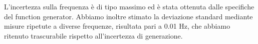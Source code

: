 \documentclass[../Relazione_circuiti]{subfile}
\begin{document}
L'incertezza sulla frequenza è di tipo massimo ed è stata ottenuta dalle specifiche del function generator. Abbiamo inoltre stimato la deviazione standard mediante misure ripetute a diverse frequenze, risultata pari a 0.01 Hz, che abbiamo ritenuto trascurabile rispetto all'incertezza di generazione.
\end{document}
